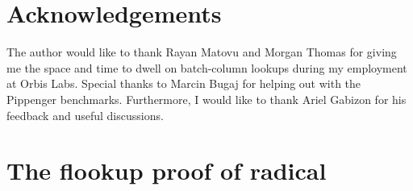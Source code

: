\documentclass[11pt]{article}
\theoremstyle{definition}
\theoremstyle{definition}
\begin{document}

\section{Acknowledgements}

The author would like to thank Rayan Matovu and Morgan Thomas for giving me the space and time to dwell on batch-column lookups during my employment at Orbis Labs.
Special thanks to Marcin Bugaj for helping out with the Pippenger benchmarks.
Furthermore, I would like to thank Ariel Gabizon for his feedback and useful discussions.







\newpage
\appendix
\section{The flookup proof of radical}
\label{s:uv:flookup}
\end{document}
